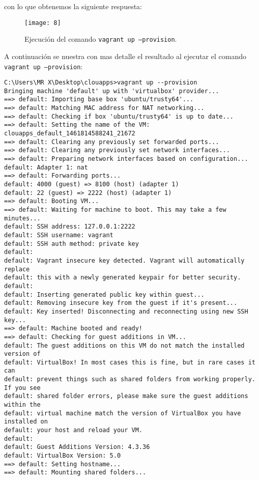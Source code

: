 \documentclass[10pt]{article}   			%
\begin{document}
\begin{enumerate}
con lo que obtenemos la siguiente respuesta:

\begin{figure}[ht] 
	\centering
	\texttt{[image: 8]}   
	\caption{Ejecución del comando \texttt{vagrant up --provision}.} 
\end{figure}

A continuación se nuestra con mas detalle el resultado al ejecutar el comando  \texttt{vagrant up --provision}:\\
 
	
\begin{small}
	\begin{lstlisting}[frame=single]	
C:\Users\MR X\Desktop\clouapps>vagrant up --provision
Bringing machine 'default' up with 'virtualbox' provider...
==> default: Importing base box 'ubuntu/trusty64'...
==> default: Matching MAC address for NAT networking...
==> default: Checking if box 'ubuntu/trusty64' is up to date...
==> default: Setting the name of the VM: clouapps_default_1461814588241_21672
==> default: Clearing any previously set forwarded ports...
==> default: Clearing any previously set network interfaces...
==> default: Preparing network interfaces based on configuration...
default: Adapter 1: nat
==> default: Forwarding ports...
default: 4000 (guest) => 8100 (host) (adapter 1)
default: 22 (guest) => 2222 (host) (adapter 1)
==> default: Booting VM...
==> default: Waiting for machine to boot. This may take a few minutes...
default: SSH address: 127.0.0.1:2222
default: SSH username: vagrant
default: SSH auth method: private key
default:
default: Vagrant insecure key detected. Vagrant will automatically replace
default: this with a newly generated keypair for better security.
default:
default: Inserting generated public key within guest...
default: Removing insecure key from the guest if it's present...
default: Key inserted! Disconnecting and reconnecting using new SSH key...
==> default: Machine booted and ready!
==> default: Checking for guest additions in VM...
default: The guest additions on this VM do not match the installed version of
default: VirtualBox! In most cases this is fine, but in rare cases it can
default: prevent things such as shared folders from working properly. If you see
default: shared folder errors, please make sure the guest additions within the
default: virtual machine match the version of VirtualBox you have installed on
default: your host and reload your VM.
default:
default: Guest Additions Version: 4.3.36
default: VirtualBox Version: 5.0
==> default: Setting hostname...
==> default: Mounting shared folders...

\end{lstlisting}
\end{small}
\end{enumerate}
\end{document}
